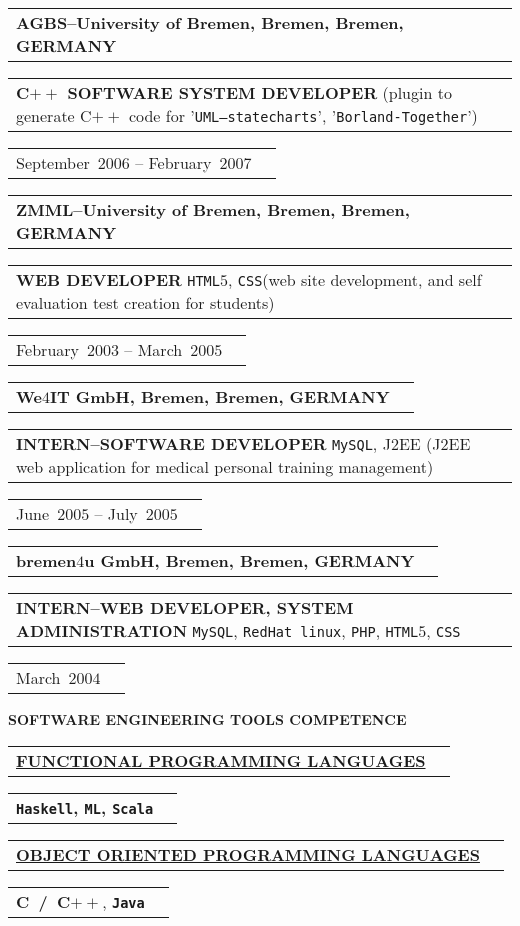 \documentclass[9pt,a4paper]{article} %
\makeatletter
\newcommand{\headerrow}[2]
{\begin{tabular*}{\linewidth}{l@{\extracolsep{\fill}}r}
	#1 &
	#2 \\
\end{tabular*}}
\newcommand{\headerrowONE}[1]{\headerrow{#1}{}}
\newcommand{\cplusplus}{C$++$\xspace}
\newcommand{\java}{\texttt{Java}\xspace}
\newcommand{\css}{\texttt{CSS}\xspace}
\newcommand{\html}{\texttt{HTML$5$}\xspace}
\newcommand{\jtwoee}{J$2$EE\xspace}
\newcommand{\php}{\texttt{PHP}\xspace}
\newcommand{\scala}{\texttt{Scala}\xspace}
\newcommand{\haskell}{\texttt{Haskell}\xspace}
\newcommand{\ml}{\texttt{ML}\xspace}
\newcommand{\mysql}{\texttt{MySQL}\xspace}
\newcommand{\redhat}{\texttt{RedHat~linux}\xspace}
\newcommand{\cvitemdate}[2]{#1~$#2$\xspace}
\newcommand{\cvitempositionheld}[1]{\textbf{#1}\xspace}
\makeatother
\begin{document}
\vspace{0.3em}

\headerrowONE{\textbf{AGBS--University of Bremen, Bremen, Bremen, GERMANY}}	
\headerrowONE{\cvitempositionheld{\cplusplus SOFTWARE SYSTEM DEVELOPER}
(plugin to generate \cplusplus code for '\texttt{UML--statecharts}',
'\texttt{Borland-Together}')}
\headerrowONE{\cvitemdate{September}{2006} -- \cvitemdate{February}{2007}}	

\vspace{0.3em}

\headerrowONE{\textbf{ZMML--University of Bremen, Bremen, Bremen, GERMANY}}	
\headerrowONE{\cvitempositionheld{WEB DEVELOPER} \html, \css (web site development,
and self evaluation test creation for students)}
\headerrowONE{\cvitemdate{February}{2003} -- \cvitemdate{March}{2005}}	

\vspace{0.3em}

\headerrowONE{\textbf{We$4$IT GmbH, Bremen, Bremen, GERMANY}}	
\headerrowONE{\cvitempositionheld{INTERN--SOFTWARE DEVELOPER} \mysql, \jtwoee
(\jtwoee web application for medical personal training management)}
\headerrowONE{\cvitemdate{June}{2005} -- \cvitemdate{July}{2005}}
	
\vspace{0.3em}

\headerrowONE{\textbf{bremen$4$u GmbH, Bremen, Bremen, GERMANY}}	
\headerrowONE{\cvitempositionheld{INTERN--WEB DEVELOPER, SYSTEM ADMINISTRATION} \mysql, \redhat, \php,
\html, \css}
\headerrowONE{\cvitemdate{March}{2004}}	

\vspace{2em}

\newpage


\vspace{0em}

\begin{center}
{\large \textbf{SOFTWARE ENGINEERING TOOLS COMPETENCE}}
\end{center}

\vspace{0.5em}

\headerrowONE{\textbf{\underline{FUNCTIONAL PROGRAMMING LANGUAGES}}}
\headerrowONE{\textbf{\textbf{\haskell}, \textbf{\ml}, \scala}}

\vspace{0.3em}

\headerrowONE{\textbf{\underline{OBJECT ORIENTED PROGRAMMING LANGUAGES}}}
\headerrowONE{\textbf{C~/~\cplusplus}, \textbf{\java}}
\end{document}
